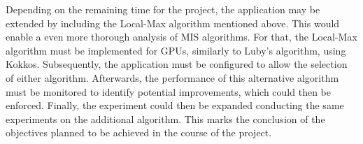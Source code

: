 \documentclass[acmsmall,nonacm,screen,review]{acmart}
\begin{document}
Depending on the remaining time for the project, the application may be extended by including the Local-Max algorithm mentioned above. This would enable a even more thorough analysis of MIS algorithms. For that, the Local-Max algorithm must be implemented for GPUs, similarly to Luby's algorithm, using Kokkos. Subsequently, the application must be configured to allow the selection of either algorithm. Afterwards, the performance of this alternative algorithm must be monitored to identify potential improvements, which could then be enforced. Finally, the experiment could then be expanded conducting the same experiments on the additional algorithm. This marks the conclusion of the objectives planned to be achieved in the course of the project.  



\end{document}
